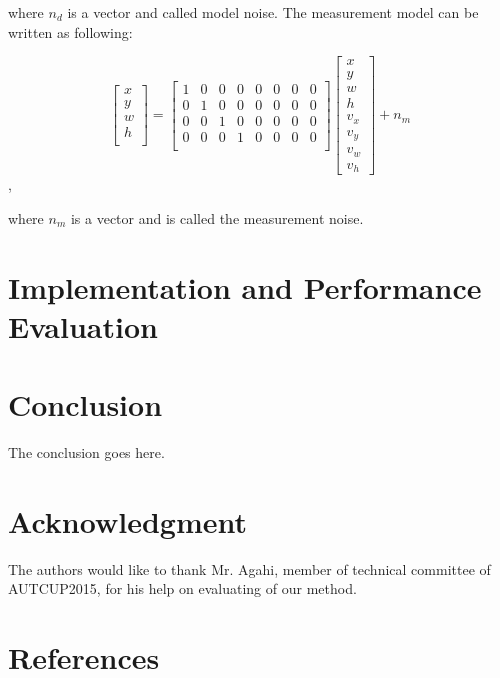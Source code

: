 \documentclass[conference]{IEEEtran}
\begin{document}
where $n_d$ is a vector and called model noise. The measurement model can be written as following:

\[
\begin{bmatrix}
x \\
y \\
w \\
h \\
\end{bmatrix}
=
\begin{bmatrix}
1 &0 & 0 & 0  & 0 & 0 &0 &0 \\
0 &1 & 0 & 0  & 0 & 0 &0 &0 \\
0 &0 & 1 & 0  & 0 & 0 &0 &0 \\
0 &0 & 0 & 1  & 0 & 0 &0 &0 \\

\end{bmatrix}
\begin{bmatrix}
x \\
y \\
w \\
h \\
v_x \\
v_y \\
v_w \\
v_h
\end{bmatrix}+n_m
\],

where $n_m$ is a vector and is called the measurement noise. 


\section{Implementation and Performance Evaluation}


\section{Conclusion}
The conclusion goes here.






\section*{Acknowledgment}


The authors would like to thank Mr. Agahi, member of technical committee of AUTCUP2015, for his help on evaluating of our method.




\section{References}

\end{document}
